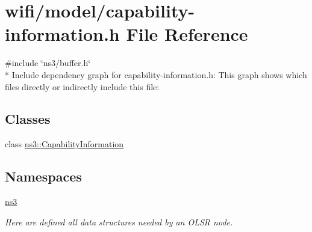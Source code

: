 \hypertarget{capability-information_8h}{}\section{wifi/model/capability-\/information.h File Reference}
\label{capability-information_8h}
{\ttfamily \#include \char`\"{}ns3/buffer.\+h\char`\"{}}\\*
Include dependency graph for capability-\/information.h\+:
This graph shows which files directly or indirectly include this file\+:
\subsection*{Classes}
\begin{DoxyCompactItemize}
\item 
class \hyperlink{classns3_1_1CapabilityInformation}{ns3\+::\+Capability\+Information}
\end{DoxyCompactItemize}
\subsection*{Namespaces}
\begin{DoxyCompactItemize}
\item 
 \hyperlink{namespacens3}{ns3}
\begin{DoxyCompactList}\small\item\em Here are defined all data structures needed by an O\+L\+SR node. \end{DoxyCompactList}\end{DoxyCompactItemize}
